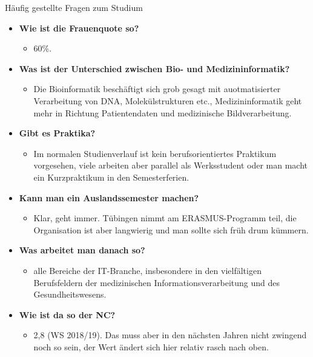 \begin{block}{Häufig gestellte Fragen zum Studium}
\begin{large}
\begin{itemize}
	\item \textbf{Wie ist die Frauenquote so?}
	\begin{itemize}
		\item 60\%.
	\end{itemize}
\end{itemize}

\begin{itemize}
	\item \textbf{Was ist der Unterschied zwischen Bio- und Medizininformatik?}
	\begin{itemize}
		\item Die Bioinformatik beschäftigt sich grob gesagt mit auotmatisierter Verarbeitung von DNA, Molekülstrukturen etc., Medizininformatik geht mehr in Richtung Patientendaten und medizinische Bildverarbeitung.
	\end{itemize}
\end{itemize}

\begin{itemize}
	\item \textbf{Gibt es Praktika?}
	\begin{itemize}
		\item Im normalen Studienverlauf ist kein berufsorientiertes Praktikum vorgesehen, viele arbeiten aber parallel als Werksstudent oder man macht ein Kurzpraktikum in den Semesterferien.
	\end{itemize}
\end{itemize}

\begin{itemize}
	\item \textbf{Kann man ein Auslandssemester machen?}
	\begin{itemize}
		\item Klar, geht immer. Tübingen nimmt am ERASMUS-Programm teil, die Organisation ist aber langwierig und man sollte sich früh drum kümmern.
	\end{itemize}
\end{itemize}

\begin{itemize}
	\item \textbf{Was arbeitet man danach so?}
	\begin{itemize}
		\item alle Bereiche der IT-Branche, insbesondere in den vielfältigen Berufsfeldern der medizinischen Informationsverarbeitung und des Gesundheitswesens.
	\end{itemize}
\end{itemize}

\begin{itemize}
	\item \textbf{Wie ist da so der NC?}
	\begin{itemize}
		\item 2,8 (WS 2018/19). Das muss aber in den nächsten Jahren nicht zwingend noch so sein, der Wert ändert sich hier relativ rasch nach oben.
	\end{itemize}
\end{itemize}

\end{large}
\end{block}
